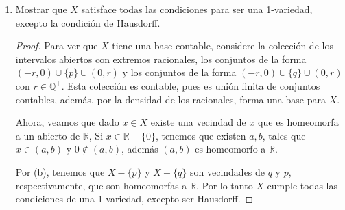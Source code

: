 \begin{enumerate}
\begin{proof}
            Para ver que $X$ no es Hausdorff, tome $p$ y $q$ y sean $U_p$, $U_q$ vecindades de $p$ y $q$ respectivamente, tales que $q \neq U_p$ y $p \neq U_q$. Ya que $U_p$ es abierto, existe $(-a,0)\cup {p} \cup (0,a) \subseteq U_p$ para algún $a>0$, de manera análoga existe $(-b,0)\cup \{q\} \cup (0,b) \subseteq U_q$ con $b>0$, ahora tome $c=\min\{a,b\}$, note que $(-c,0)\cup (0,c) \subseteq U_p \cap U_q$, luego $X$ no puede ser Hausdorff. 
         \end{proof}
        \item Mostrar que \( X \) satisface todas las condiciones para ser una 1-variedad, excepto la condición de Hausdorff.
        \begin{proof}
            Para ver que $X$ tiene una base contable, considere la colección de los intervalos abiertos con extremos racionales, los conjuntos de la forma $(-r,0)\cup \{p\} \cup (0,r)$ y los conjuntos de la forma $(-r,0) \cup \{q\} \cup (0,r)$ con $r \in \mathbb{Q}^+$. Esta colección es contable, pues es unión finita de conjuntos contables, además, por la densidad de los racionales, forma una base para $X$.

            Ahora, veamos que dado $x \in X$ existe una vecindad de $x$ que es homeomorfa a un abierto de $\mathbb{R}$, Si $x \in \mathbb{R}-\{0\}$, tenemos que existen $a,b$, tales que $x \in 
            (a,b)$ y $0 \notin (a,b)$, además $(a,b)$ es homeomorfo a $\mathbb{R}$.

            Por (b), tenemos que $X-\{p\}$ y $X-\{q\}$ son vecindades de $q$ y $p$, respectivamente, que son homeomorfas a $\mathbb{R}$. Por lo tanto $X$ cumple todas las condiciones de una 1-variedad, excepto ser Hausdorff.
        \end{proof}
    \end{enumerate}